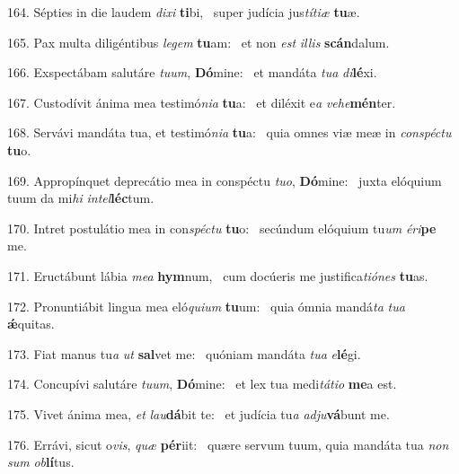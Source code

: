 164. Sépties in die laudem \textit{di}\textit{xi} \textbf{ti}bi, \ast\  super judícia jus\textit{tí}\textit{ti}\textit{æ} \textbf{tu}æ.\

165. Pax multa diligéntibus \textit{le}\textit{gem} \textbf{tu}am: \ast\  et non \textit{est} \textit{il}\textit{lis} \textbf{scán}dalum.\

166. Exspectábam salutáre \textit{tu}\textit{um}, \textbf{Dó}mine: \ast\  et mandáta \textit{tu}\textit{a} \textit{di}\textbf{lé}xi.\

167. Custodívit ánima mea testimó\textit{ni}\textit{a} \textbf{tu}a: \ast\  et diléxit e\textit{a} \textit{ve}\textit{he}\textbf{mén}ter.\

168. Servávi mandáta tua, et testimó\textit{ni}\textit{a} \textbf{tu}a: \ast\  quia omnes viæ meæ in \textit{con}\textit{spéc}\textit{tu} \textbf{tu}o.\

169. Appropínquet deprecátio mea in conspéctu \textit{tu}\textit{o}, \textbf{Dó}mine: \ast\  juxta elóquium tuum da mi\textit{hi} \textit{in}\textit{tel}\textbf{léc}tum.\

170. Intret postulátio mea in con\textit{spéc}\textit{tu} \textbf{tu}o: \ast\  secúndum elóquium tu\textit{um} \textit{é}\textit{ri}\textbf{pe} me.\

171. Eructábunt lábia \textit{me}\textit{a} \textbf{hym}num, \ast\  cum docúeris me justifica\textit{ti}\textit{ó}\textit{nes} \textbf{tu}as.\

172. Pronuntiábit lingua mea eló\textit{qui}\textit{um} \textbf{tu}um: \ast\  quia ómnia mandá\textit{ta} \textit{tu}\textit{a} \textbf{ǽ}quitas.\

173. Fiat manus tu\textit{a} \textit{ut} \textbf{sal}vet me: \ast\  quóniam mandáta \textit{tu}\textit{a} \textit{e}\textbf{lé}gi.\

174. Concupívi salutáre \textit{tu}\textit{um}, \textbf{Dó}mine: \ast\  et lex tua medi\textit{tá}\textit{ti}\textit{o} \textbf{me}a est.\

175. Vivet ánima mea, \textit{et} \textit{lau}\textbf{dá}bit te: \ast\  et judícia tu\textit{a} \textit{ad}\textit{ju}\textbf{vá}bunt me.\

176. Errávi, sicut o\textit{vis}, \textit{quæ} \textbf{pér}iit: \ast\  quære servum tuum, quia mandáta tua \textit{non} \textit{sum} \textit{ob}\textbf{lí}tus.\

